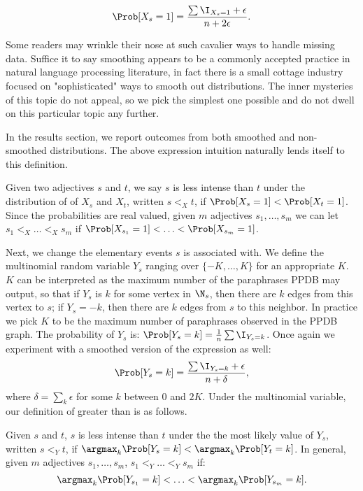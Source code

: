 \[	
	\Prob[X_s = 1] = \frac{\sum \I_{X_s = 1} + \epsilon}{n + 2\epsilon}.
\]

\begin{remark}
Some readers may wrinkle their nose at such cavalier ways to handle missing data. Suffice it to say smoothing appears to be a commonly accepted practice in natural language processing literature, in fact there is a small cottage industry focused on "sophisticated" ways to smooth out distributions. The inner mysteries of this topic do not appeal, so we pick the simplest one possible and do not dwell on this particular topic any further. 
\end{remark}

In the results section, we report outcomes from both smoothed and non-smoothed distributions. The above expression intuition naturally lends itself to this definition.

\theoremstyle{definition}
\begin{definition}
Given two adjectives $s$ and $t$, we say $s$ is less intense than $t$ under the distribution of of $X_s$ and $X_t$, written $s <_{X} t$, if $\Prob[X_s = 1] < \Prob[X_t = 1]$. Since the probabilities are real valued, given $m$ adjectives $s_1, \ldots, s_m$ we can let $s_1 <_X \ldots <_X s_m$ if $\Prob[X_{s_1} = 1] < \ldots < \Prob[X_{s_m} = 1]$.
\end{definition}

Next, we change the elementary events $s$ is associated with. We define the multinomial random variable $Y_s$ ranging over $\{-K,\ldots,K\}$ for an appropriate $K$. $K$ can be interpreted as the maximum number of the paraphrases PPDB may output, so that if $Y_s$ is $k$ for some vertex in $\N_s$, then there are $k$ edges from this vertex to $s$; if $Y_s = -k$, then there are $k$ edges from $s$ to this neighbor. In practice we pick $K$ to be the maximum number of paraphrases observed in the PPDB graph. The probability of $Y_s$ is: $\Prob[Y_s = k] = \frac{1}{n} \sum \I_{Y_s = k}$. Once again we experiment with a smoothed version of the expression as well:
\[
	\Prob[Y_s = k] = \frac{\sum \I_{Y_s = k} + \epsilon}{n + \delta},
\]
where $\delta = \sum_{k} \epsilon$ for some $k$ between $0$ and $2K$. Under the multinomial variable, our definition of greater than is as follows.

 \theoremstyle{definition}
\begin{definition}
Given $s$ and $t$, $s$ is less intense than $t$ under the the most likely value of $Y_s$, written $s <_Y t$, if $\argmax_{k} \Prob[Y_s = k] < \argmax_{k} \Prob[Y_t = k]$. In general, given $m$ adjectives $s_1, \ldots, s_m$, $s_1 <_Y \ldots <_Y s_m$ if:
	\[
		\argmax_{k} \Prob[Y_{s_1} = k] < \ldots < \argmax_{k} \Prob[Y_{s_m} = k].
	\]
\end{definition}

